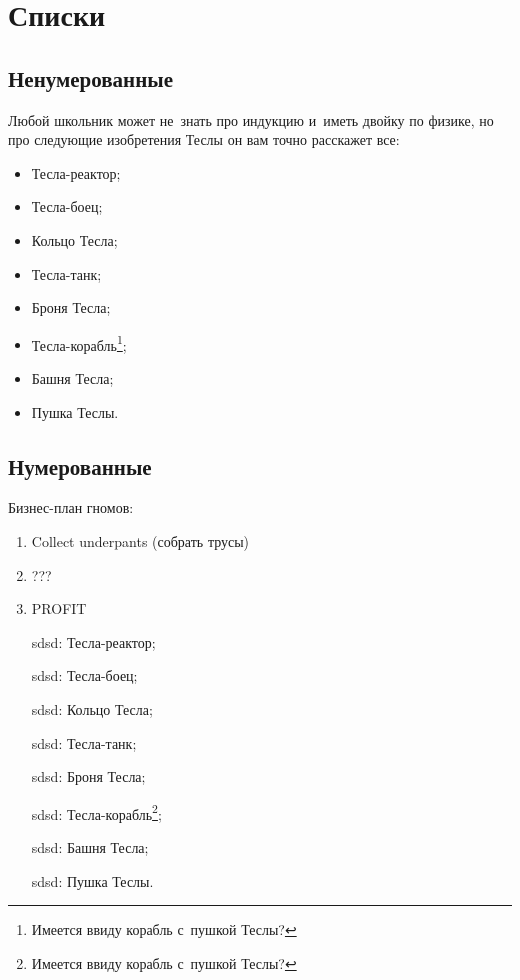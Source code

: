 \documentclass[12pt]{article}
\begin{document}
\section{Списки}

\subsection{Ненумерованные}

Любой школьник может не~знать про индукцию и~иметь двойку по физике,
но про следующие изобретения Теслы он вам точно расскажет все:
\begin{itemize}
    \item Тесла-реактор;
    \item Тесла-боец;
    \item Кольцо Тесла;
    \item Тесла-танк;
    \item Броня Тесла;
    \item Тесла-корабль\footnote{Имеется ввиду корабль с~пушкой Теслы?};
    \item Башня Тесла;
    \item Пушка Теслы.
\end{itemize}

\subsection{Нумерованные}

Бизнес-план гномов:
\begin{enumerate}
    \item Collect underpants (собрать трусы)
    \item ???
    \item PROFIT
\end{enumerate}

\begin{itemize}
    \item[sdsd:] Тесла-реактор;
    \item[sdsd:] Тесла-боец;
    \item[sdsd:] Кольцо Тесла;
    \item[sdsd:] Тесла-танк;
    \item[sdsd:] Броня Тесла;
    \item[sdsd:] Тесла-корабль\footnote{Имеется ввиду корабль с~пушкой Теслы?};
    \item[sdsd:] Башня Тесла;
    \item[sdsd:] Пушка Теслы.
\end{itemize}
\end{document}
